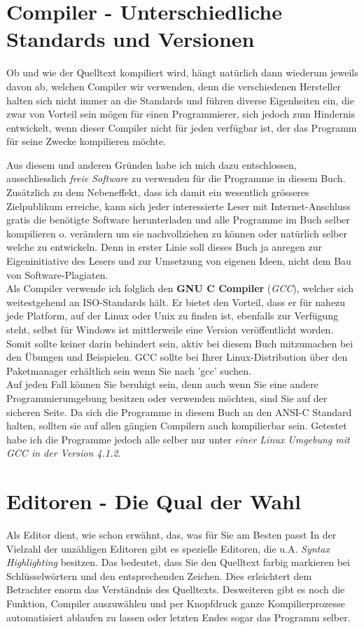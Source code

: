 \documentclass[b5paper,10pt,dvips,fleqn,titlepage,twoside]{book}
\begin{document}
\section{Compiler - Unterschiedliche Standards und Versionen}
Ob und wie der Quelltext kompiliert wird, hängt natürlich dann wiederum jeweils davon ab, welchen Compiler wir verwenden, denn die verschiedenen Hersteller halten sich nicht immer an die Standards und führen diverse Eigenheiten ein, die zwar von Vorteil sein mögen für einen Programmierer, sich jedoch zum Hindernis entwickelt, wenn dieser Compiler nicht für jeden verfügbar ist, der das Programm für seine Zwecke kompilieren möchte.\\\newline

Aus diesem und anderen Gründen habe ich mich dazu entschlossen, ausschliesslich \emph{freie Software} zu verwenden für die Programme in diesem Buch. Zusätzlich zu dem Nebeneffekt, dass ich damit ein wesentlich grösseres  Zielpublikum erreiche, kann sich jeder interessierte Leser mit Internet-Anschluss gratis die benötigte Software herunterladen und alle Programme im Buch selber kompilieren o. verändern um sie nachvollziehen zu können oder natürlich selber welche zu entwickeln. Denn in erster Linie soll dieses Buch ja anregen zur Eigeninitiative des Lesers und zur Umsetzung von eigenen Ideen, nicht dem Bau von Software-Plagiaten.
\\
Als Compiler verwende ich folglich den \textbf{GNU C Compiler} (\emph{GCC}), welcher sich weitestgehend an ISO-Standards hält. Er bietet den Vorteil, dass er für nahezu jede Platform, auf der Linux oder Unix zu finden ist, ebenfalls zur Verfügung steht, selbst für Windows ist mittlerweile eine Version veröffentlicht worden. Somit sollte keiner darin behindert sein, aktiv bei diesem Buch mitzumachen bei den Übungen und Beispielen. GCC sollte bei Ihrer Linux-Distribution über den Paketmanager erhältlich sein wenn Sie nach 'gcc' suchen.
\\\newline
Auf jeden Fall können Sie beruhigt sein, denn auch wenn Sie eine andere Programmierumgebung besitzen oder verwenden möchten, sind Sie auf der sicheren Seite. Da sich die Programme in diesem Buch an den ANSI-C Standard halten, sollten sie auf allen gängien Compilern auch kompilierbar sein. Getestet habe ich die Programme jedoch alle selber nur unter \emph{einer Linux Umgebung mit GCC in der Version 4.1.2}.
\section{Editoren - Die Qual der Wahl}
Als Editor dient, wie schon erwähnt, das, was für Sie am Besten passt In der Vielzahl der unzähligen Editoren gibt es spezielle Editoren, die u.A. \emph{Syntax Highlighting} besitzen. Das bedeutet, dass Sie den Quelltext farbig markieren bei Schlüsselwörtern und den entsprechenden Zeichen. Dies erleichtert dem Betrachter enorm das Verständnis des Quelltexts. Desweiteren gibt es noch die Funktion, Compiler auszuwählen und per Knopfdruck ganze Kompilierprozesse automatisiert ablaufen zu lassen oder letzten Endes sogar das Programm selber.
\end{document}
